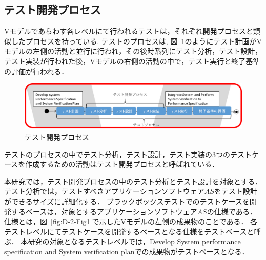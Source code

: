 \subsection{テスト開発プロセス}
Vモデルであらわす各レベルにて行われるテストは，それぞれ開発プロセスと類似したプロセスを持っている.
テストのプロセスは, 図~\ref{fig:D-2-Fig2J}のようにテスト計画がVモデルの左側の活動と並行に行われ，その後時系列にテスト分析，テスト設計，テスト実装が行われた後，Vモデルの右側の活動の中で，テスト実行と終了基準の評価が行われる．
\begin{figure}[htbp]
  \begin{center}
  \includegraphics[width=14cm]{./image/D-2-Fig2J.png}
  \caption{テスト開発プロセス}
  \label{fig:D-2-Fig2J}
  \end{center}
\end{figure}
テストのプロセスの中でテスト分析，テスト設計，テスト実装の3つのテストケースを作成するための活動はテスト開発プロセスと呼ばれている\cite{ISTQB}．

本研究では，テスト開発プロセスの中のテスト分析とテスト設計を対象とする．
テスト分析では，テストすべきアプリケーションソフトウェア$AS$をテスト設計ができるサイズに詳細化する．
ブラックボックステストでのテストケースを開発するベースは，対象とするアプリケーションソフトウェア$AS$の仕様である\cite{stocks1996framework}．
仕様とは，図~\ref{fig:D-2-Fig1}で示したVモデルの左側の成果物のことである．
各テストレベルにてテストケースを開発するベースとなる仕様をテストベースと呼ぶ\cite{craig2002systematic}．
本研究の対象となるテストレベルでは，Develop System performance specification and System verification planでの成果物がテストベースとなる．

